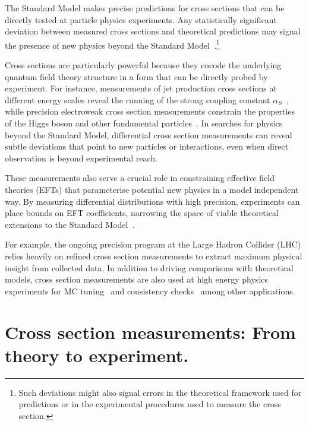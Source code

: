 The Standard Model makes precise predictions for cross sections that can be directly tested at particle physics experiments.
%
Any statistically significant deviation between measured cross sections and theoretical predictions may signal the presence of new physics beyond the Standard Model~\cite{particle_data_group_review_2022}.\footnote{Such deviations might also signal errors in the theoretical framework used for predictions or in the experimental procedures used to measure the cross section.
} 

Cross sections are particularly powerful because they encode the underlying quantum field theory structure in a form that can be directly probed by experiment.
%
For instance, measurements of jet production cross sections at different energy scales reveal the running of the strong coupling constant \(\alpha_S\)~\cite{chiefa_parton_2025}, while precision electroweak cross section measurements constrain the properties of the Higgs boson and other fundamental particles~\cite{noauthor_precision_2006}.
%
In searches for physics beyond the Standard Model, differential cross section measurements can reveal subtle deviations that point to new particles or interactions, even when direct observation is beyond experimental reach.

These measurements also serve a crucial role in constraining effective field theories (EFTs) that parameterise potential new physics in a model independent way.
%
By measuring differential distributions with high precision, experiments can place bounds on EFT coefficients, narrowing the space of viable theoretical extensions to the Standard Model~\cite{contino_validity_2016}.

For example, the ongoing precision program at the Large Hadron Collider (LHC) relies heavily on refined cross section measurements to extract maximum physical insight from collected data.
%
In addition to driving comparisons with theoretical models, cross section measurements are also used at high energy physics experiments for MC tuning~\cite{albert_antares_2025} and consistency checks~\cite{buckley_constraints_2025} among other applications.

\section{Cross section measurements: From theory to experiment.}
\sectionminitoc
